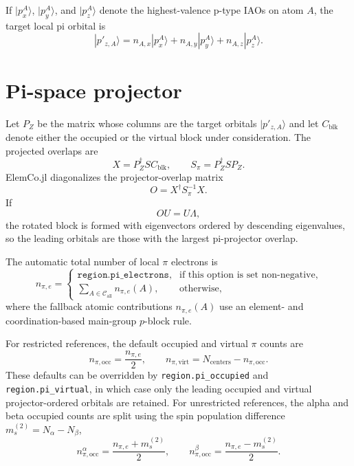 \documentclass[a4paper,12pt,oneside]{book}
\newcommand{\elemcoil}{\textsf{ElemCo.jl}}
\newcommand{\cmd}[1]{\texttt{#1}}
\begin{document}
If $|p_x^A\rangle$, $|p_y^A\rangle$, and $|p_z^A\rangle$ denote the highest-valence p-type IAOs on atom $A$, the target local pi orbital is
\begin{equation}
  |p'_{z,A}\rangle = n_{A,x}|p_x^A\rangle + n_{A,y}|p_y^A\rangle + n_{A,z}|p_z^A\rangle.
\end{equation}

\section{Pi-space projector}

Let $P_Z$ be the matrix whose columns are the target orbitals $|p'_{z,A}\rangle$ and let $C_{\mathrm{blk}}$ denote either the occupied or the virtual block under consideration.
The projected overlaps are
\begin{equation}
  X = P_Z^\dagger S C_{\mathrm{blk}},
  \qquad
  S_\pi = P_Z^\dagger S P_Z.
\end{equation}
\elemcoil{} diagonalizes the projector-overlap matrix
\begin{equation}
  O = X^\dagger S_\pi^{-1} X.
\end{equation}
If
\begin{equation}
  O U = U \Lambda,
\end{equation}
the rotated block is formed with eigenvectors ordered by descending eigenvalues, so the leading orbitals are those with the largest pi-projector overlap.

The automatic total number of local $\pi$ electrons is
\begin{equation}
  n_{\pi,e} =
  \begin{cases}
    \cmd{region.pi\_electrons}, & \text{if this option is set non-negative}, \\
    \sum\limits_{A \in \mathcal{C}_{\mathrm{all}}} n_{\pi,e}(A), & \text{otherwise},
  \end{cases}
\end{equation}
where the fallback atomic contributions $n_{\pi,e}(A)$ use an element- and coordination-based main-group $p$-block rule.

For restricted references, the default occupied and virtual $\pi$ counts are
\begin{equation}
  n_{\pi,\mathrm{occ}} = \frac{n_{\pi,e}}{2},
  \qquad
  n_{\pi,\mathrm{virt}} = N_{\mathrm{centers}} - n_{\pi,\mathrm{occ}}.
\end{equation}
These defaults can be overridden by \cmd{region.pi\_occupied} and \cmd{region.pi\_virtual}, in which case only the leading occupied and virtual projector-ordered orbitals are retained.
For unrestricted references, the alpha and beta occupied counts are split using the spin population difference $m_s^{(2)} = N_\alpha - N_\beta$,
\begin{equation}
  n_{\pi,\mathrm{occ}}^\alpha = \frac{n_{\pi,e} + m_s^{(2)}}{2},
  \qquad
  n_{\pi,\mathrm{occ}}^\beta = \frac{n_{\pi,e} - m_s^{(2)}}{2}.
\end{equation}
\end{document}
